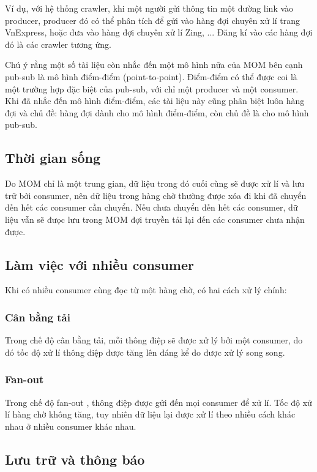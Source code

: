 \documentclass{article}
\begin{document}
Ví dụ, với hệ thống crawler, khi một người gửi thông tin một đường link vào
producer, producer đó có thể phân tích để gửi vào hàng đợi chuyên xử lí trang
VnExpress, hoặc đưa vào hàng đợi chuyên xử lí Zing, ... Đăng kí vào các hàng đợi
đó là các crawler tương ứng.

Chú ý rằng một số tài liệu còn nhắc đến một mô hình nữa của MOM bên cạnh pub-sub
là mô hình điểm-điểm (point-to-point). Điểm-điểm có thể được coi là một trường
hợp đặc biệt của pub-sub, với chỉ một producer và một consumer. Khi đã nhắc đến
mô hình điểm-điểm, các tài liệu này cũng phân biệt luôn hàng đợi và chủ đề: hàng
đợi dành cho mô hình điểm-điểm, còn chủ đề là cho mô hình pub-sub.

\subsection{Thời gian sống}

Do MOM chỉ là một trung gian, dữ liệu trong đó cuối cùng sẽ được xử lí và lưu
trữ bởi consumer, nên dữ liệu trong hàng chờ thường được xóa đi khi đã chuyển
đến hết các consumer cần chuyển. Nếu chưa chuyển đến hết các consumer, dữ liệu
vẫn sẽ đưọc lưu trong MOM đợi truyền tải lại đến các consumer chưa nhận được.

\subsection{Làm việc với nhiều consumer}

Khi có nhiều consumer cùng đọc từ một hàng chờ, có hai cách xử lý chính:

\subsubsection{Cân bằng tải}

Trong chế độ cân bằng tải, mỗi thông điệp sẽ được xử lý bởi một consumer, do đó
tốc độ xử lí thông điệp được tăng lên đáng kể do được xử lý song song.

\subsubsection{Fan-out}

Trong chế độ fan-out \cite{waitingforcode2019}, thông điệp được gửi đến mọi
consumer để xử lí. Tốc độ xử lí hàng chờ không tăng, tuy nhiên dữ liệu lại được
xử lí theo nhiều cách khác nhau ở nhiều consumer khác nhau.

\subsection{Lưu trữ và thông báo}
\end{document}
